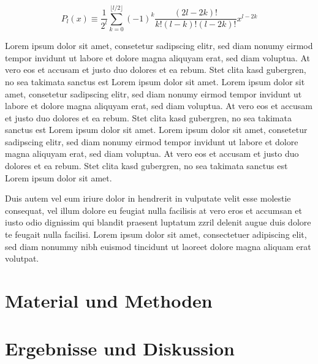 \documentclass[ %
	DIV=15,
	BCOR=14mm, %
	parskip=half, %
	headsepline, %
	cleardoublepage=empty, %
	tablecaptionabove, %
	toc=bib, %
	toc=listofnumbered, %
	listof=leveldown, %
	numbers=noendperiod %
	]{scrbook}
\begin{document}
\begin{equation}
	P_l (x)\equiv\frac {1}{2^l}\sum_{k=0}^{\lfloor l/2\rfloor} (-1)^k \frac{(2l-2k)!}{k!(l-k)!(l-2k)!} x^{l-2k}
\end{equation}

Lorem ipsum dolor sit amet, consetetur sadipscing elitr, sed diam nonumy eirmod tempor invidunt ut labore et dolore magna aliquyam erat, sed diam voluptua. At vero eos et accusam et justo duo dolores et ea rebum. Stet clita kasd gubergren, no sea takimata sanctus est Lorem ipsum dolor sit amet. Lorem ipsum dolor sit amet, consetetur sadipscing elitr, sed diam nonumy eirmod tempor invidunt ut labore et dolore magna aliquyam erat, sed diam voluptua. At vero eos et accusam et justo duo dolores et ea rebum. Stet clita kasd gubergren, no sea takimata sanctus est Lorem ipsum dolor sit amet. Lorem ipsum dolor sit amet, consetetur sadipscing elitr, sed diam nonumy eirmod tempor invidunt ut labore et dolore magna aliquyam erat, sed diam voluptua. At vero eos et accusam et justo duo dolores et ea rebum. Stet clita kasd gubergren, no sea takimata sanctus est Lorem ipsum dolor sit amet. 

Duis autem vel eum iriure dolor in hendrerit in vulputate velit esse molestie consequat, vel illum dolore eu feugiat nulla facilisis at vero eros et accumsan et iusto odio dignissim qui blandit praesent luptatum zzril delenit augue duis dolore te feugait nulla facilisi. Lorem ipsum dolor sit amet, consectetuer adipiscing elit, sed diam nonummy nibh euismod tincidunt ut laoreet dolore magna aliquam erat volutpat.



\chapter{Material und Methoden} %
\label{cha:material_und_methoden}


\chapter{Ergebnisse und Diskussion} %
\label{cha:ergebnisse_und_diskussion}
\end{document}
